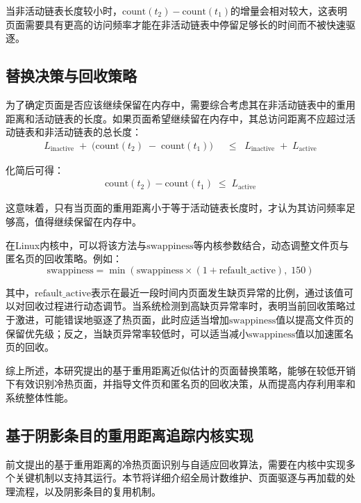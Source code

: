 当非活动链表长度较小时，\(\mathrm{count}(t_2) - \mathrm{count}(t_1)\)的增量会相对较大，这表明页面需要具有更高的访问频率才能在非活动链表中停留足够长的时间而不被快速驱逐。

\subsection{替换决策与回收策略}

为了确定页面是否应该继续保留在内存中，需要综合考虑其在非活动链表中的重用距离和活动链表的长度。如果页面希望继续留在内存中，其总访问距离不应超过活动链表和非活动链表的总长度：
\begin{align}
  \label{eq:active_condition_1}
  L_{\mathrm{inactive}}
  \;+\;
  \bigl(\mathrm{count}(t_2) \;-\; \mathrm{count}(t_1)\bigr)
  &\;\;\le\;\;
  L_{\mathrm{inactive}}
  \;+\;
  L_{\mathrm{active}}
\end{align}

化简后可得：
\begin{align}
  \label{eq:active_condition}
  \mathrm{count}(t_2) - \mathrm{count}(t_1)
  \;\le\;
  L_{\mathrm{active}}
\end{align}

这意味着，只有当页面的重用距离小于等于活动链表长度时，才认为其访问频率足够高，值得继续保留在内存中。

在Linux内核中，可以将该方法与\(\mathrm{swappiness}\)等内核参数结合，动态调整文件页与匿名页的回收策略。例如：
\begin{equation}
  \label{swappiness1}
  \mathrm{swappiness} = \min \left( \mathrm{swappiness} \times (1 + \mathrm{refault\_active}), \; 150 \right)
\end{equation}

其中，\(\mathrm{refault\_active}\)表示在最近一段时间内页面发生缺页异常的比例，通过该值可以对回收过程进行动态调节。当系统检测到高缺页异常率时，表明当前回收策略过于激进，可能错误地驱逐了热页面，此时应适当增加\(\mathrm{swappiness}\)值以提高文件页的保留优先级；反之，当缺页异常率较低时，可以适当减小\(\mathrm{swappiness}\)值以加速匿名页的回收。

综上所述，本研究提出的基于重用距离近似估计的页面替换策略，能够在较低开销下有效识别冷热页面，并指导文件页和匿名页的回收决策，从而提高内存利用率和系统整体性能。

\subsection{基于阴影条目的重用距离追踪内核实现}

前文提出的基于重用距离的冷热页面识别与自适应回收算法，需要在内核中实现多个关键机制以支持其运行。本节将详细介绍全局计数维护、页面驱逐与再加载的处理流程，以及阴影条目的复用机制。

